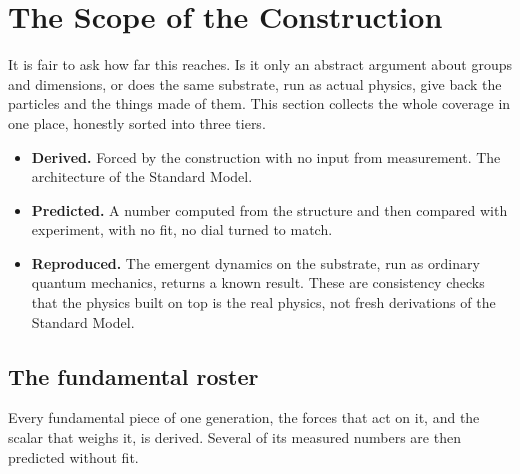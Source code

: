 \section{The Scope of the Construction} \label{sec:scope}

It is fair to ask how far this reaches. Is it only an abstract argument about groups and dimensions, or does the same
substrate, run as actual physics, give back the particles and the things made of them. This section collects the whole
coverage in one place, honestly sorted into three tiers.

\begin{itemize}
  \item \textbf{Derived.} Forced by the construction with no input from measurement. The architecture of the Standard
  Model.
  \item \textbf{Predicted.} A number computed from the structure and then compared with experiment, with no fit, no
  dial turned to match.
  \item \textbf{Reproduced.} The emergent dynamics on the substrate, run as ordinary quantum mechanics, returns a known
  result. These are consistency checks that the physics built on top is the real physics, not fresh derivations of the
  Standard Model.
\end{itemize}

\subsection{The fundamental roster}

Every fundamental piece of one generation, the forces that act on it, and the scalar that weighs it, is derived. Several
of its measured numbers are then predicted without fit.

